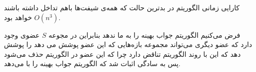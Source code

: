 \documentclass[]{article}
\begin{document}
کارایی زمانی الگوریتم در بدترین حالت که همه‌ی شیفت‌ها
باهم تداخل داشته باشند $O(n^3)$ خواهد بود.

فرض می‌کنیم الگوریتم جواب بهینه را به ما ندهد بنابراین
در مجوعه $S$ عضوی وجود دارد که عضو دیگری می‌تواند
مجموعه بازه‌هایی که این عضو پوشش می دهد را پوشش دهد که این با روند الگوریتم
تناقض دارد چرا که این عضو در الگوریتم حذف می‌شود پس به سادگی اثبات شد که
الگوریتم جواب بهینه را با می‌دهد.
\end{document}
